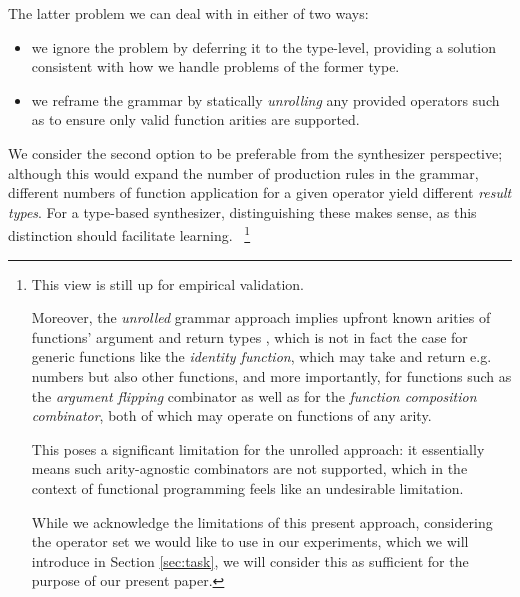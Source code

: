 \documentclass{article}
\begin{document}
The latter problem we can deal with in either of two ways:
\begin{itemize}
    \item we ignore the problem by deferring it to the type-level,
    providing a solution consistent with how we handle problems of the former type.
    \item we reframe the grammar by statically \emph{unrolling} any provided operators such as to ensure only valid function arities are supported.
\end{itemize}

We consider the second option to be preferable from the synthesizer perspective;
although this would expand the number of production rules in the grammar,
different numbers of function application for a given operator yield different \emph{result types}.
For a type-based synthesizer, distinguishing these makes sense,
as this distinction should facilitate learning.%
~\footnote{
    This view is still up for empirical validation.

    Moreover, the \emph{unrolled} grammar approach implies upfront known arities of functions' argument and return types%
    ,
    which is not in fact the case for generic functions like the \emph{identity function},
    which may take and return e.g. numbers but also other functions,
    and more importantly, for functions such as the \emph{argument flipping} combinator
    as well as for the \emph{function composition combinator},
    both of which may operate on functions of any arity.

    This poses a significant limitation for the unrolled approach:
    it essentially means such arity-agnostic combinators are not supported,
    which in the context of functional programming feels like an undesirable limitation.

    While we acknowledge the limitations of this present approach,
    considering the operator set we would like to use in our experiments,
    which we will introduce in Section \ref{sec:task},
    we will consider this as sufficient for the purpose of our present paper.

}
\end{document}
